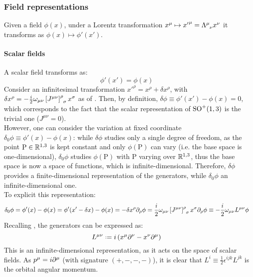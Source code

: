\subsubsection{Field representations}

Given a field $ \phi(x) $, under a Lorentz transformation $ x^\mu \mapsto {x'}^\mu = \tensor{\Lambda}{^\mu_\nu} x^\nu $ it transforms as $ \phi(x) \mapsto \phi'(x') $.

\paragraph{Scalar fields}

A scalar field transforms as:
\begin{equation}
  \phi'(x') = \phi(x)
\end{equation}
Consider an infinitesimal transformation $ x'^\rho = x^\rho + \delta x^\rho $, with $ \delta x^\rho = - \frac{i}{2} \omega_{\mu \nu} \tensor{\left[ J^{\mu \nu} \right]}{^\rho_\sigma} x^\sigma $ as of . Then, by definition, $ \delta \phi \equiv \phi'(x') - \phi(x) = 0 $, which corresponds to the fact that the scalar representation of $ \mathrm{SO}^+(1,3) $ is the trivial one ($ J^{\mu \nu} = 0 $).\\
However, one can consider the variation at fixed coordinate $ \delta_0 \phi \equiv \phi'(x) - \phi(x) $: while $ \delta \phi $ studies only a single degree of freedom, as the point $ \text{P} \in \mathbb{R}^{1,3} $ is kept constant and only $ \phi(\text{P}) $ can vary (i.e. the base space is one-dimensional), $ \delta_0 \phi $ studies $ \phi(\text{P}) $ with $ \text{P} $ varying over $ \mathbb{R}^{1,3} $, thus the base space is now a space of functions, which is infinite-dimensional. Therefore, $ \delta \phi $ provides a finite-dimensional representation of the generators, while $ \delta_0 \phi $ an infinite-dimensional one.\\
To explicit this representation:
\begin{equation*}
  \delta_0 \phi = \phi'(x) - \phi(x) = \phi'(x' - \delta x) - \phi(x) = - \delta x^\rho \pa_\rho \phi = \frac{i}{2} \omega_{\mu \nu} \tensor{\left[ J^{\mu \nu} \right]}{^\rho_\sigma} x^\sigma \pa_\rho \phi \equiv - \frac{i}{2} \omega_{\mu \nu} L^{\mu \nu} \phi
\end{equation*}
Recalling , the generators can be expressed as:
\begin{equation}
  L^{\mu \nu} \defeq i \left( x^\mu \pa^\nu - x^\nu \pa^\mu \right)
  \label{eq:ang-mom-oper}
\end{equation}
This is an infinite-dimensional representation, as it acts on the space of scalar fields. As $ p^\mu = i \partial^\mu $ (with signature $ (+,-,-,-) $), it is clear that $ L^i \equiv \frac{1}{2} \epsilon^{ijk} L^{jk} $ is the orbital angular momentum.

